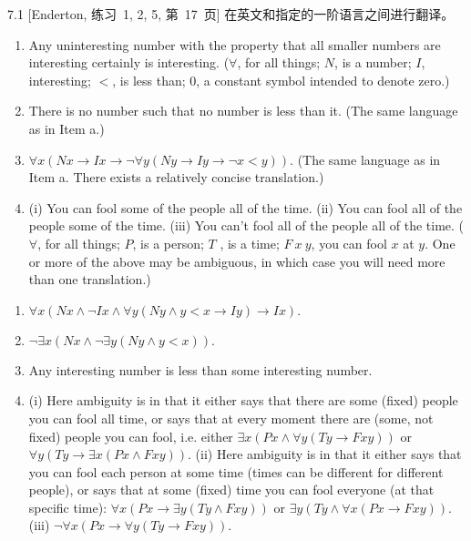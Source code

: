 
\begin{exercise}{7.1}
  [Enderton, 练习~1, 2, 5, 第~17~页]
  在英文和指定的一阶语言之间进行翻译。
  \begin{enumerate}[label=(\alph*)]
    \item Any uninteresting number with the property that all smaller numbers are interesting certainly is interesting. ($\forall$, for all things; $N$, is a number; $I$, interesting; $<$, is less than; $0$, a constant symbol intended to denote zero.)
    \item There is no number such that no number is less than it. (The same language as in Item a.)
    \item $\forall x(Nx\rightarrow Ix\rightarrow\neg\forall y(Ny\rightarrow Iy\rightarrow\neg x<y))$. (The same language as in Item a. There exists a relatively concise translation.)
    \item (i) You can fool some of the people all of the time. (ii) You can fool all of the people some of the time. (iii) You can’t fool all of the people all of the time. ($\forall$, for all things; $P$, is a person; $T$ , is a time; $F\ x\ y$, you can fool $x$ at $y$. One or more of the above may be ambiguous, in which case you will need more than one translation.)\qedhere
  \end{enumerate}
\end{exercise}

\begin{enumerate}[label=(\alph*)]
  \item $\forall x(Nx\wedge\neg Ix\wedge\forall y (Ny\wedge y<x\rightarrow Iy)\rightarrow Ix).$
  \item $\neg\exists x(Nx\wedge\neg\exists y(Ny\wedge y<x)).$
  \item Any interesting number is less than some interesting number.
  \item (i) Here ambiguity is in that it either says that there are some (fixed) people you can fool all time, or says that at every moment there are (some, not fixed) people you can fool, i.e. either $\exists x(Px\wedge\forall y(Ty\to Fxy))$ or $\forall y(Ty\to\exists x(Px\wedge Fxy))$. (ii) Here ambiguity is in that it either says that you can fool each person at some time (times can be different for different people), or says that at some (fixed) time you can fool everyone (at that specific time): $\forall x(Px\to\exists y(Ty\wedge Fxy))$ or $\exists y(Ty\wedge\forall x(Px\to Fxy))$. (iii) $\neg\forall x(Px\to\forall y(Ty\to Fxy)).$
\end{enumerate}

